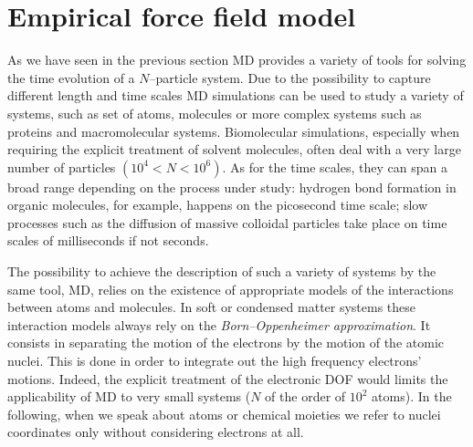 \chapter{Empirical force field model}
\label{chap:EmpiricalFF}
As we have seen in the previous section \ac{MD} provides a variety of tools for solving the time evolution of a
$N$--particle system. Due to the possibility to capture different length and time scales \ac{MD} simulations can
be used to study a variety of systems, such as set of atoms, molecules or more complex systems such as proteins and
macromolecular systems. Biomolecular simulations, especially when requiring the explicit treatment of solvent molecules, often deal with a very large number of particles $(10^4 < N < 10^6)$. As for the time scales, they can span a broad range depending on the process under study: hydrogen bond formation in organic molecules, for example, happens on the picosecond time scale; slow processes such as the diffusion of massive colloidal particles take place on time scales of milliseconds if not seconds. 


The possibility to achieve the description of such a variety of systems by the same tool, \ac{MD}, relies on the existence of appropriate models of the interactions between atoms and molecules. In soft or condensed matter systems these interaction models always rely on the \textit{Born--Oppenheimer approximation}. It consists in separating the motion of the electrons by the motion of the atomic nuclei. This is done in order to integrate out the high frequency electrons' motions. Indeed, the explicit treatment of the electronic \ac{DOF} would limits the applicability of \ac{MD} to very small systems ($N$ of the order of $10^2$ atoms). In the following, when we speak about atoms or chemical moieties we refer to nuclei coordinates only without considering electrons at all.

